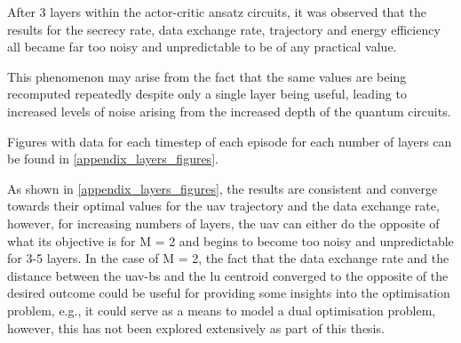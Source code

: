 After 3 layers within the actor-critic ansatz circuits, it was observed that the results for the secrecy rate, data exchange rate, trajectory and energy efficiency all became far too noisy and unpredictable to be of any practical value. 

This phenomenon may arise from the fact that the same values are being recomputed repeatedly despite only a single layer being useful, leading to increased levels of noise arising from the increased depth of the quantum circuits. 

Figures with data for each timestep of each episode for each number of layers can be found in \ref{appendix_layers_figures}. 

As shown in \ref{appendix_layers_figures}, the results are consistent and converge towards their optimal values for the \acrshort{uav} trajectory and the data exchange rate, however, for increasing numbers of layers, the \acrshort{uav} can either do the opposite of what its objective is for M = 2 and begins to become too noisy and unpredictable for 3-5 layers. 
In the case of M = 2, the fact that the data exchange rate and the distance between the \acrshort{uav}-\acrshort{bs} and the \acrshort{lu} centroid converged to the opposite of the desired outcome could be useful for providing some insights into the optimisation problem, e.g., it could serve as a means to model a dual optimisation problem, however, this has not been explored extensively as part of this thesis. 